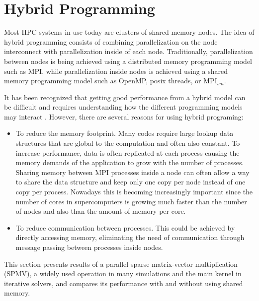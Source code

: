 \section{Hybrid Programming} %

Most HPC systems in use today are clusters of shared memory nodes. The idea of hybrid programming consists of combining parallelization on the node interconnect with parallelization inside of each node. Traditionally, parallelization between nodes is being achieved using a distributed memory programming model such as MPI, while parallelization inside nodes is achieved using a shared memory programming model such as OpenMP, posix threads, or MPI$_{sm}$. 

\medskip
It has been recognized that getting good performance from a hybrid model can be difficult and requires understanding how the different programming models may interact \cite{UsingAdvancedMPI}. However, there are several reasons for using hybrid programing:

\begin{itemize} 

\item To reduce the memory footprint. Many codes require large lookup data structures that are global to the computation and often also constant. To increase performance, data is often replicated at each process causing the memory demands of the application to grow with the number of processes. Sharing memory between MPI processes inside a node can often allow a way to share the data structure and keep only one copy per node instead of one copy per process. Nowadays this is becoming increasingly important since the number of cores in supercomputers is growing much faster than the number of nodes and also than the amount of memory-per-core.

\item To reduce communication between processes. This could be achieved by directly accessing memory, eliminating the need of communication through message passing between processes inside nodes.


\end{itemize}


\medskip

This section presents results of a parallel sparse matrix-vector multiplication (SPMV), a widely used operation in many simulations and the main kernel in iterative solvers, and compares its performance with and without using shared memory.


\medskip


